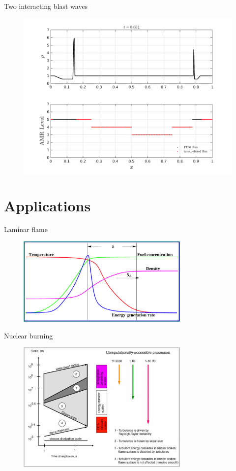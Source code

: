 \documentclass{beamer}
\begin{document}
\begin{frame}{Two interacting blast waves}
  \begin{figure}
    \center
    \includegraphics[scale=0.4]{blast2_early.png}
  \end{figure}
\end{frame}

\section{Applications}

\begin{frame}{Laminar flame}
  \begin{figure}
    \center
      \includegraphics[width=0.75\textwidth]{laminarflame.png}
  \end{figure}
\end{frame}

\begin{frame}{Nuclear burning}
  \begin{figure}
    \center
      \includegraphics[width=0.75\textwidth]{scales.png}
  \end{figure}
\end{frame}
\end{document}
